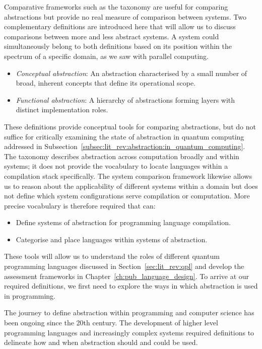 Comparative frameworks such as the taxonomy are useful for comparing abstractions but provide no real measure of comparison between systems.
Two complementary definitions are introduced here that will allow us to discuss comparisons between more and less abstract systems.
A system could simultaneously belong to both definitions based on its position within the spectrum of a specific domain, as we saw with parallel computing.
\begin{itemize}
    \item \textit{Conceptual abstraction}: An abstraction characterised by a small number of broad, inherent concepts that define its operational scope.
    \item \textit{Functional abstraction}: A hierarchy of abstractions forming layers with distinct implementation roles.
\end{itemize}

These definitions provide conceptual tools for comparing abstractions, but do not suffice for critically examining the state of abstraction in quantum computing addressed in Subsection~\ref{subsec:lit_rev:abstraction:in_quantum_computing}.
The taxonomy describes abstraction across computation broadly and within systems; it does not provide the vocabulary to locate languages within a compilation stack specifically.
The system comparison framework likewise allows us to reason about the applicability of different systems within a domain but does not define which system configurations serve compilation or computation.
More precise vocabulary is therefore required that can:
\begin{itemize}
    \item Define systems of abstraction for programming language compilation.
    \item Categorise and place languages within systems of abstraction.
\end{itemize}

These tools will allow us to understand the roles of different quantum programming languages discussed in Section~\ref{sec:lit_rev:qpl} and develop the assessment frameworks in Chapter~\ref{ch:pub_language_design}.
To arrive at our required definitions, we first need to explore the ways in which abstraction is used in programming.

The journey to define abstraction within programming and computer science has been ongoing since the 20th century.
The development of higher level programming languages and increasingly complex systems required definitions to delineate how and when abstraction should and could be used.

